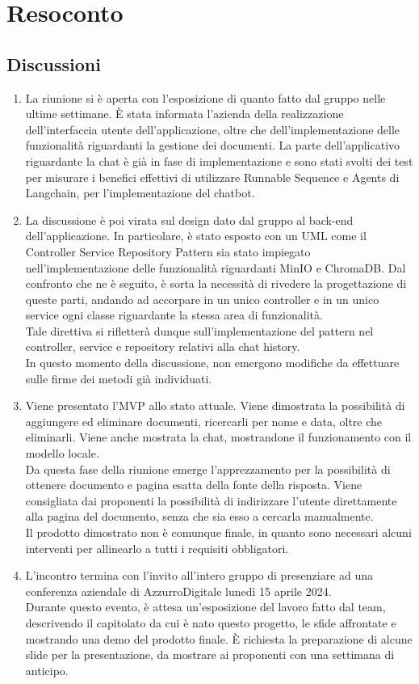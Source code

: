 \section{Resoconto} \label{sec:resoconto}
\subsection{Discussioni} \label{subsec:resdiscussione}
\begin{enumerate}
    \item La riunione si è aperta con l'esposizione di quanto fatto dal gruppo nelle ultime settimane. È stata informata l'azienda della realizzazione dell'interfaccia utente dell'applicazione, oltre che dell'implementazione delle funzionalità riguardanti la gestione dei documenti. La parte dell'applicativo riguardante la chat è già in fase di implementazione e sono stati svolti dei test per misurare i benefici effettivi di utilizzare Runnable Sequence e Agents di Langchain, per l'implementazione del chatbot.
    \item La discussione è poi virata sul design dato dal gruppo al back-end dell'applicazione. In particolare, è stato esposto con un UML come il Controller Service Repository Pattern sia stato impiegato nell'implementazione delle funzionalità riguardanti MinIO e ChromaDB. Dal confronto che ne è seguito, è sorta la necessità di rivedere la progettazione di queste parti, andando ad accorpare in un unico controller e in un unico service ogni classe riguardante la stessa area di funzionalità.\\
    Tale direttiva si rifletterà dunque sull'implementazione del pattern nel controller, service e repository relativi alla chat history.\\
    In questo momento della discussione, non emergono modifiche da effettuare sulle firme dei metodi già individuati.
    \item Viene presentato l'MVP allo stato attuale. Viene dimostrata la possibilità di aggiungere ed eliminare documenti, ricercarli per nome e data, oltre che eliminarli. Viene anche mostrata la chat, mostrandone il funzionamento con il modello locale.\\
    Da questa fase della riunione emerge l'apprezzamento per la possibilità di ottenere documento e pagina esatta della fonte della risposta. Viene consigliata dai proponenti la possibilità di indirizzare l'utente direttamente alla pagina del documento, senza che sia esso a cercarla manualmente.\\
    Il prodotto dimostrato non è comunque finale, in quanto sono necessari alcuni interventi per allinearlo a tutti i requisiti obbligatori.
    \item L'incontro termina con l'invito all'intero gruppo di presenziare ad una conferenza aziendale di AzzurroDigitale lunedì 15 aprile 2024.\\
    Durante questo evento, è attesa un'esposizione del lavoro fatto dal team, descrivendo il capitolato da cui è nato questo progetto, le sfide affrontate e mostrando una demo del prodotto finale. È richiesta la preparazione di alcune slide per la presentazione, da mostrare ai proponenti con una settimana di anticipo.
\end{enumerate}


